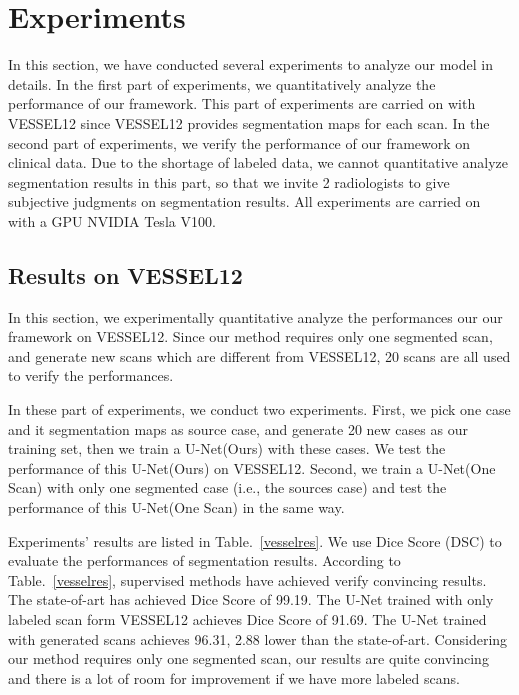 \documentclass{article}
\begin{document}
\section{Experiments}
\label{sec:experiments}
In this section, we have conducted several experiments to analyze our model in details. 
In the first part of experiments, we quantitatively analyze the performance of our framework. This part of experiments are carried on with VESSEL12 since VESSEL12 provides segmentation maps for each scan.
In the second part of experiments, we verify the performance of our framework on clinical data. 
Due to the shortage of labeled data, we cannot quantitative analyze segmentation results in this part, so that we invite 2 radiologists to give subjective judgments on segmentation results.
All experiments are carried on with a GPU NVIDIA Tesla V100.

\subsection{Results on VESSEL12}
\label{subsec:vessel}
In this section, we experimentally quantitative analyze the performances our our framework on VESSEL12. Since our method requires only one segmented scan, and generate new scans which are different from VESSEL12, 20 scans are all used to verify the performances.

In these part of experiments, we conduct two experiments.
First, we pick one case and it segmentation maps as source case, and generate 20 new cases as our training set, then we train a U-Net(Ours) with these cases. We test the performance of this U-Net(Ours) on VESSEL12.
Second, we train a U-Net(One Scan) with only one segmented case (i.e., the sources case) and test the performance of this U-Net(One Scan) in the same way.

Experiments' results are listed in Table.~\ref{vesselres}. We use Dice Score (DSC) \cite{dice1945measures} to evaluate the performances of segmentation results. According to Table.~\ref{vesselres}, supervised methods have achieved verify convincing results. The state-of-art has achieved Dice Score of 99.19. The U-Net trained with only labeled scan form VESSEL12 achieves Dice Score of 91.69. The U-Net trained with generated scans achieves 96.31, 2.88 lower than the state-of-art. Considering our method requires only one segmented scan, our results are quite convincing and there is a lot of room for improvement if we have more labeled scans.
\end{document}
